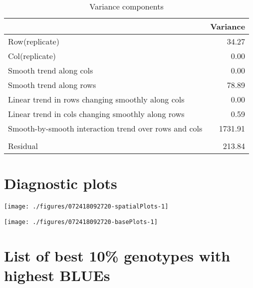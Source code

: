 \documentclass[a4paper,11pt]{article}\usepackage[]{graphicx}\usepackage[]{color}
\newenvironment{knitrout}{}{} %
\begin{document}
\begin{table}[ht]
\begin{flushleft}
\caption{Variance components} 
\label{varComps}
\begin{tabular}{lr}
  \hline
 & Variance \\ 
  \hline
Row(replicate) & 34.27 \\ 
  Col(replicate) & 0.00 \\ 
  Smooth trend along cols & 0.00 \\ 
  Smooth trend along rows & 78.89 \\ 
  Linear trend in rows changing smoothly along cols & 0.00 \\ 
  Linear trend in cols changing smoothly along rows & 0.59 \\ 
  Smooth-by-smooth interaction trend over rows and cols & 1731.91 \\ 
   &  \\ 
  Residual & 213.84 \\ 
   \hline
\end{tabular}
\end{flushleft}
\end{table}

\clearpage

\section{Diagnostic plots}

\texttt{[image: ./figures/072418092720-spatialPlots-1]} 

\begin{knitrout}
\color{fgcolor}
\texttt{[image: ./figures/072418092720-basePlots-1]} 

\end{knitrout}
\newpage

\section{List of best 10\% genotypes with
highest BLUEs}
\end{document}
